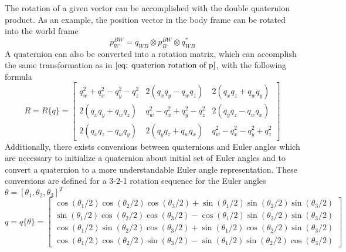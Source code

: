 The rotation of a given vector can be accomplished with the double quaternion product. As an example, the position vector in the body frame can be rotated into the world frame
\begin{equation}
        p_W^{BW} = q_{WB} \otimes p_B^{BW} \otimes q_{WB}^*
    \label{eq: quaterion rotation of p}
\end{equation}
A quaternion can also be converted into a rotation matrix, which can accomplish the same transformation as in $\eqref{eq: quaterion rotation of p}$, with the following formula \cite{Quaternion_Kinematics_for_the_Error-state_EKF}
\begin{equation}
    R = R\{q\} = \left[\begin{array}{ccc}q_w^2+q_x^2-q_y^2-q_z^2 & 2\left(q_x q_y-q_w q_z\right) & 2\left(q_x q_z+q_w q_y\right) \\ 2\left(q_x q_y+q_w q_z\right) & q_w^2-q_x^2+q_y^2-q_z^2 & 2\left(q_y q_z-q_w q_x\right) \\ 2\left(q_x q_z-q_w q_y\right) & 2\left(q_y q_z+q_w q_x\right) & q_w^2-q_x^2-q_y^2+q_z^2\end{array}\right]
    \label{eq: q to R}
\end{equation}
Additionally, there exists conversions between quaternions and Euler angles which are necessary to initialize a quaternion about initial set of  Euler angles and to convert a quaternion to a more understandable Euler angle representation. These conversions are defined for a 3-2-1 rotation sequence for the Euler angles $\theta = [\theta_1, \theta_2, \theta_3]^T$ \cite{EulerQ} \cite{blanco2021tutorial}
\begin{equation}
    q = q\{\theta\} = \left[\begin{array}{c}\cos (\theta_1 / 2) \cos (\theta_2 / 2) \cos (\theta_3 / 2)+\sin (\theta_1 / 2) \sin (\theta_2 / 2) \sin (\theta_3 / 2) \\ \sin (\theta_1 / 2) \cos (\theta_2 / 2) \cos (\theta_3 / 2)-\cos (\theta_1 / 2) \sin (\theta_2 / 2) \sin (\theta_3 / 2) \\ \cos (\theta_1 / 2) \sin (\theta_2 / 2) \cos (\theta_3 / 2)+\sin (\theta_1 / 2) \cos (\theta_2 / 2) \sin (\theta_3 / 2) \\ \cos (\theta_1 / 2) \cos (\theta_2 / 2) \sin (\theta_3 / 2)-\sin (\theta_1 / 2) \sin (\theta_2 / 2) \cos (\theta_3 / 2)\end{array}\right]
    \label{eq: Euler to quaternion}
\end{equation}


